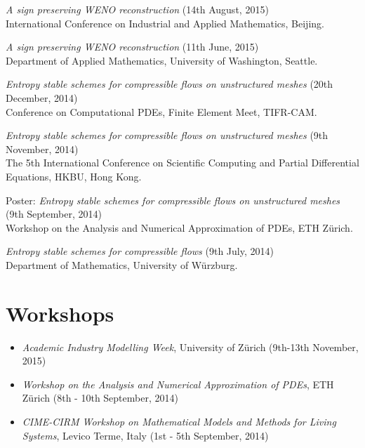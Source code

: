 \documentclass[margin]{res}
\begin{document}
\begin{resume}
              {\it A sign preserving WENO reconstruction} (14th August, 2015)\\
              International Conference on Industrial and Applied Mathematics, Beijing.
              
              {\it A sign preserving WENO reconstruction} (11th June, 2015)\\
              Department of Applied Mathematics, University of Washington, Seattle.
              
              {\it Entropy stable schemes for compressible flows on unstructured meshes} (20th December, 2014)\\
               Conference on Computational PDEs, Finite Element Meet, TIFR-CAM.  
              
              {\it Entropy stable schemes for compressible flows on unstructured meshes} (9th November, 2014)\\
               The 5th International Conference on Scientific Computing and Partial Differential Equations, HKBU, Hong Kong.              
             
              Poster: {\it Entropy stable schemes for compressible flows on unstructured meshes} (9th September, 2014)\\
               Workshop on the Analysis and Numerical Approximation of PDEs, ETH Z\"{u}rich.
              
              {\it Entropy stable schemes for compressible flows} (9th July, 2014)\\
               Department of Mathematics, University of W\"{u}rzburg.             

\section{Workshops} 
             \begin{itemize}
             \item {\it Academic Industry Modelling Week}, University of Z\"{u}rich  (9th-13th November, 2015) 
             
              \item{\it Workshop on the Analysis and Numerical Approximation of PDEs}, ETH Z\"{u}rich (8th - 10th September, 2014)
               
               \item{\it CIME-CIRM Workshop on Mathematical Models and Methods for Living Systems}, Levico Terme, Italy (1st - 5th September, 2014)


\end{itemize}
\end{resume}
\end{document}
